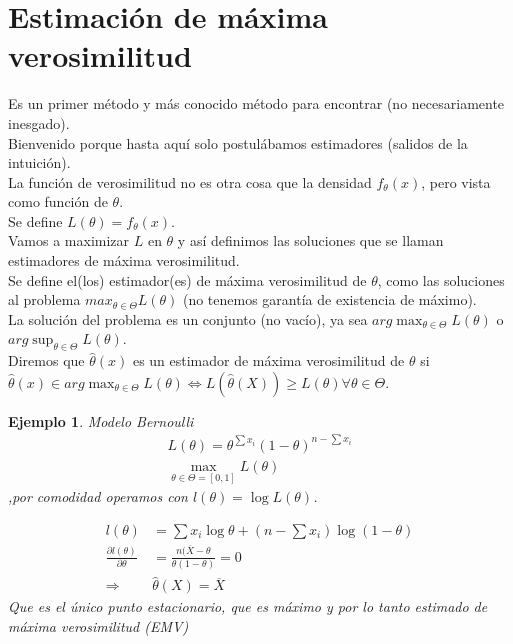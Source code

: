 \documentclass[10pt]{article}
\theoremstyle{plain}
\newtheorem{ej}{Ejemplo}
\theoremstyle{definition}
\begin{document}
\section{Estimación de máxima verosimilitud}
Es un primer método y más conocido método para encontrar (no necesariamente inesgado).\\
Bienvenido porque hasta aquí solo postulábamos estimadores (salidos de la intuición).\\
La función de verosimilitud no es otra cosa que la densidad $f_{\theta}(x)$, pero vista como función de $\theta$.\\
Se define $L(\theta) = f_{\theta}(x)$.\\
Vamos a maximizar $L$ en $\theta$ y así definimos las soluciones que se llaman estimadores de máxima verosimilitud.\\
Se define el(los) estimador(es) de máxima verosimilitud de $\theta$, como las soluciones al problema $max_{\theta \in \Theta}L(\theta)$ (no tenemos garantía de existencia de máximo).\\
La solución del problema es un conjunto (no vacío), ya sea $arg\max_{\theta \in \Theta} L(\theta)$ o  $arg\sup_{\theta \in \Theta} L(\theta)$.\\
Diremos que $\hat{\theta}(x)$ es un estimador de máxima verosimilitud de $\theta$ si $\hat{\theta}(x) \in arg\max_{\theta \in \Theta} L(\theta) \Leftrightarrow L(\hat{\theta}(X)) \ge L(\theta) \forall \theta \in \Theta$.
\begin{ej} Modelo Bernoulli\\
\begin{align*}
L(\theta) = \theta^{\sum{x_{i}}}(1-\theta)^{n-\sum{x_{i}}}\\
\max_{\theta \in \Theta = \left[0,1\right]} L(\theta)
\end{align*}
,por comodidad operamos con $l(\theta) = \log{L(\theta)}$.

\begin{align*}
l(\theta) &= \sum x_{i} \log{\theta} + (n-\sum x_{i}) \log{(1-\theta)}\\
\frac{\partial l(\theta)}{\partial \theta} &= \frac{n(\overline{X}-\theta}{\theta (1-\theta)} = 0\\
\Rightarrow &\hat{\theta}(X) = \overline{X}
\end{align*}
Que es el único punto estacionario, que es máximo y por lo tanto estimado de máxima verosimilitud (EMV)
\end{ej}
\end{document}
